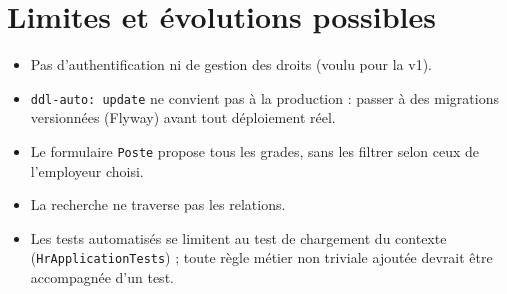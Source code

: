 \documentclass[a4paper,11pt]{article}
\newcommand{\code}[1]{\texttt{#1}}
\begin{document}
\section{Limites et évolutions possibles}

\begin{itemize}
  \item Pas d'authentification ni de gestion des droits (voulu pour la v1).
  \item \code{ddl-auto: update} ne convient pas à la production : passer à des
    migrations versionnées (Flyway) avant tout déploiement réel.
  \item Le formulaire \code{Poste} propose tous les grades, sans les filtrer
    selon ceux de l'employeur choisi.
  \item La recherche ne traverse pas les relations.
  \item Les tests automatisés se limitent au test de chargement du contexte
    (\code{HrApplicationTests}) ; toute règle métier non triviale ajoutée
    devrait être accompagnée d'un test.
\end{itemize}
\end{document}
